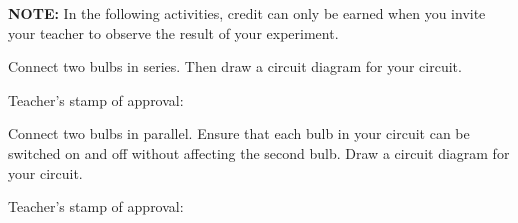 \documentclass[]{exam}
\begin{document}
\begin{questions}
\begin{EnvUplevel}
    \textbf{NOTE:} In the following activities, credit can only be earned when you invite your teacher to observe the result of your experiment.
\end{EnvUplevel}

\question
Connect two bulbs in series. Then draw a circuit diagram for your circuit.

\begin{center}
\hspace{5mm}
\begin{minipage}{4cm}
\centering
Teacher's stamp of approval: \fillin[][2em]
\end{minipage}
\end{center}



\question
Connect two bulbs in parallel. Ensure that each bulb in your circuit can be switched on and off without affecting the second bulb. Draw a circuit diagram for your circuit.

\begin{center}
\hspace{5mm}
\begin{minipage}{4cm}
\centering
Teacher's stamp of approval: \fillin[][2em]
\end{minipage}
\end{center}




\end{questions}
\end{document}
